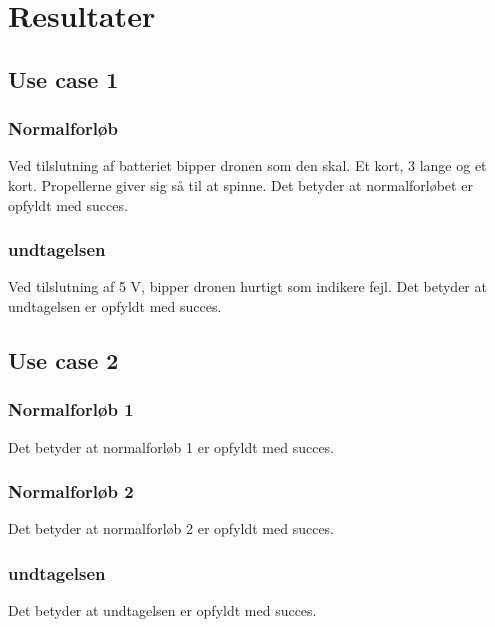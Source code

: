 \documentclass[Main]{subfiles}
\begin{document}
\section{Resultater}

\subsection{Use case 1}
\subsubsection{Normalforløb}
Ved tilslutning af batteriet bipper dronen som den skal. Et kort, 3 lange og et kort. Propellerne giver sig så til at spinne. Det betyder at normalforløbet er opfyldt med succes.

\subsubsection{undtagelsen}
Ved tilslutning af 5 V, bipper dronen hurtigt som indikere fejl.
Det betyder at undtagelsen er opfyldt med succes.


\subsection{Use case 2}
\subsubsection{Normalforløb 1}

Det betyder at normalforløb 1 er opfyldt med succes.

\subsubsection{Normalforløb 2}

Det betyder at normalforløb 2 er opfyldt med succes.

\subsubsection{undtagelsen}

Det betyder at undtagelsen er opfyldt med succes.
\end{document}
